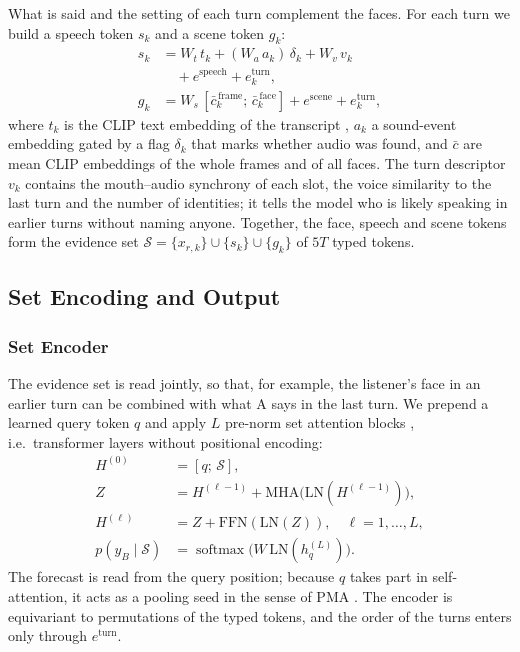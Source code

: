 \documentclass[11pt]{article}
\begin{document}
What is said and the setting of each turn complement the faces. For each turn we build a speech token $s_k$ and a
scene token $g_k$:
\begin{align}
s_k &= W_t\,t_k + (W_a\,a_k)\,\delta_k + W_v\,v_k \nonumber\\ &\quad + e^{\text{speech}} + e^{\text{turn}}_k, \label{eq:sk}\\
g_k &= W_s\,[\bar c^{\,\text{frame}}_k;\,\bar c^{\,\text{face}}_k] + e^{\text{scene}} + e^{\text{turn}}_k, \label{eq:gk}
\end{align}
where $t_k$ is the CLIP text embedding of the transcript \citep{radford2021clip}, $a_k$ a sound-event embedding
\citep{guzhov2022audioclip} gated by a flag $\delta_k$ that marks whether audio was found, and $\bar c$ are mean CLIP
embeddings of the whole frames and of all faces. The turn descriptor $v_k$ contains the mouth--audio synchrony of each
slot, the voice similarity \citep{desplanques2020ecapa} to the last turn and the number of identities; it tells the
model who is likely speaking in earlier turns without naming anyone. Together, the face, speech and scene tokens
form the evidence set $\mathcal{S} = \{x_{r,k}\} \cup \{s_k\} \cup \{g_k\}$ of $5T$ typed tokens.

\subsection{Set Encoding and Output}
\label{sec:encoder}

\subsubsection{Set Encoder}

The evidence set is read jointly, so that, for example, the listener's face in an earlier turn can be combined with
what A says in the last turn. We prepend a learned query token $q$ and apply $L$ pre-norm set attention blocks
\citep[SAB;][]{lee2019set}, i.e.\ transformer layers \citep{vaswani2017attention} without positional encoding:
\begin{align}
H^{(0)} &= [q;\,\mathcal{S}], \nonumber\\
Z &= H^{(\ell-1)} + \mathrm{MHA}\big(\mathrm{LN}(H^{(\ell-1)})\big), \nonumber\\
H^{(\ell)} &= Z + \mathrm{FFN}(\mathrm{LN}(Z)),\quad \ell = 1, \dots, L, \\
p(y_B \mid \mathcal{S}) &= \operatorname{softmax}\!\big(W\,\mathrm{LN}(h^{(L)}_q)\big).
\end{align}
The forecast is read from the query position; because $q$ takes part in self-attention, it acts as a pooling seed in
the sense of PMA \citep{lee2019set}. The encoder is equivariant to permutations of the typed tokens, and the order of
the turns enters only through $e^{\text{turn}}$.
\end{document}
